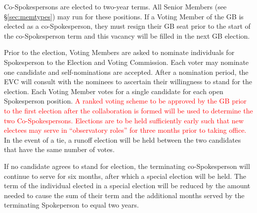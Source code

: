 \documentclass[12pt]{article}
\begin{document}
Co-Spokespersons are elected to two-year terms. All Senior Members (see \S\ref{sec:memtypes}) may  run for these positions.  %
If a Voting Member of the GB is elected as a co-Spokesperson, they must resign their GB seat prior to the start of the co-Spokesperson term and this vacancy will be filled in the next GB election. 

Prior to the election, Voting Members are asked to nominate individuals for Spokesperson to the Election and Voting Commission. Each voter may nominate one candidate and self-nominations are accepted. %
After a nomination period, the EVC will consult with the nominees to ascertain their willingness to stand for the election.
Each Voting Member votes for a single candidate for each open Spokesperson position. \textcolor{red}{A ranked voting scheme to be approved by the GB prior to the first election after the collaboration is formed will be used to determine the two Co-Spokespersons. Elections are to be held sufficiently early such that new electees may serve in ``observatory roles'' for three months prior to taking office.}
In the event of a tie, a runoff election will be held between the two candidates that have the same number of votes. 


If no candidate agrees to stand for election, the terminating co-Spokesperson will continue to serve for six months, after which a special election will be held. The term of the individual elected in a special election will be reduced by the amount needed to cause the sum of their term and the additional months served by the terminating Spokeperson to equal two years.


\end{document}
